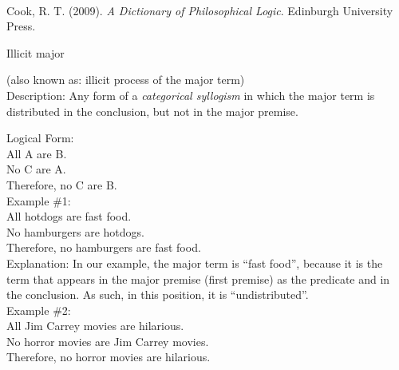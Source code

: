 \documentclass[a4paper,12pt,single,pdftex]{scrartcl}
\begin{document}
        
      \\

      
        
          Cook, R. T. (2009). {\it A Dictionary of Philosophical Logic}. Edinburgh University Press.
        
      
    
  

Illicit major
    
      (also known as: illicit process of the major term)
    \\

  
    Description: Any form of a {\it categorical syllogism} in which the major term is distributed in the conclusion, but not in the major premise.

    
      Logical Form:
    \\

    
      All A are B.
    \\

    
      No C are A.
    \\

    
      Therefore, no C are B.
    \\

    
      Example \#1:
    \\

    
      All hotdogs are fast food.
    \\

    
      No hamburgers are hotdogs.
    \\

    
      Therefore, no hamburgers are fast food.
    \\

    
      Explanation: In our example, the major term is “fast food”, because it is the term that appears in the major premise (first premise) as the predicate and in the conclusion.  As such, in this position, it is “undistributed”.
    \\

    
      Example \#2:
    \\

    
      All Jim Carrey movies are hilarious.
    \\

    
      No horror movies are Jim Carrey movies.
    \\

    
      Therefore, no horror movies are hilarious.
    \\
\end{document}
